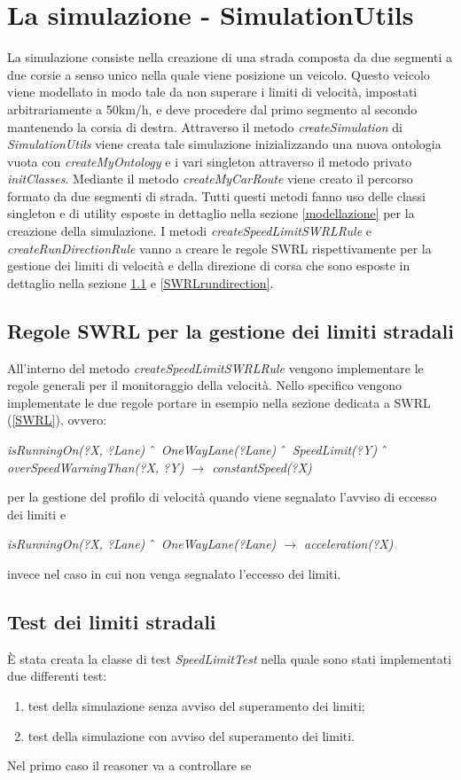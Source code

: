 \section{La simulazione - SimulationUtils}
La simulazione consiste nella creazione di una strada composta da due segmenti a due corsie a senso unico nella quale viene posizione un veicolo.
Questo veicolo viene modellato in modo tale da non superare i limiti di velocit\`a, impostati arbitrariamente a 50km/h, e deve procedere dal primo segmento al secondo mantenendo la corsia di destra.
Attraverso il metodo \textit{createSimulation} di \textit{SimulationUtils} viene creata tale simulazione inizializzando una nuova ontologia vuota con \textit{createMyOntology} e i vari singleton attraverso il metodo privato \textit{initClasses}.
Mediante il metodo \textit{createMyCarRoute} viene creato il percorso formato da due segmenti di strada.
Tutti questi metodi fanno uso delle classi singleton e di utility esposte in dettaglio nella sezione \ref{modellazione} per la creazione della simulazione.
I metodi \textit{createSpeedLimitSWRLRule} e \textit{createRunDirectionRule} vanno a creare le regole SWRL rispettivamente per la gestione dei limiti di velocit\`a e della direzione di corsa che sono esposte in dettaglio nella sezione \ref{SWRLspeedlimit} e \ref{SWRLrundirection}.
\subsection{Regole SWRL per la gestione dei limiti stradali}\label{SWRLspeedlimit}
All'interno del metodo \textit{createSpeedLimitSWRLRule} vengono implementare le regole generali per il monitoraggio della velocit\`a. Nello specifico vengono implementate le due regole portare in esempio nella sezione dedicata a SWRL (\ref{SWRL}), ovvero:
\begin{center}
\emph{isRunningOn(?X, ?Lane) $\char`\^$ OneWayLane(?Lane) $\char`\^$ SpeedLimit(?Y) $\char`\^$ overSpeedWarningThan(?X, ?Y) $\rightarrow$ constantSpeed(?X)}\\
\end{center}
per la gestione del profilo di velocit\`a quando viene segnalato l'avviso di eccesso dei limiti e
\begin{center}
\emph{isRunningOn(?X, ?Lane) $\char`\^$ OneWayLane(?Lane) $\rightarrow$ acceleration(?X)}\\
\end{center}
invece nel caso in cui non venga segnalato l'eccesso dei limiti.
\subsection{Test dei limiti stradali}
\`E stata creata la classe di test \textit{SpeedLimitTest} nella quale sono stati implementati due differenti test:
\begin{enumerate}
\item test della simulazione senza avviso del superamento dei limiti;
\item test della simulazione con avviso del superamento dei limiti.
\end{enumerate}
Nel primo caso il reasoner va a controllare se 
